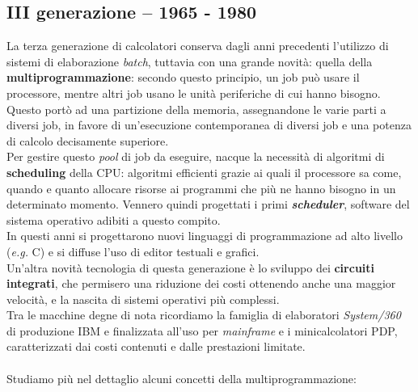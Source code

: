 \documentclass[12pt, letterpaper]{article}
\begin{document}
\subsection{III generazione -- 1965 - 1980}
La terza generazione di calcolatori conserva dagli anni precedenti l'utilizzo di sistemi di elaborazione \textit{batch}, tuttavia con una grande novità: quella della \textbf{multiprogrammazione}: secondo questo principio, un job può usare il processore, mentre altri job usano le unità periferiche di cui hanno bisogno. Questo portò ad una partizione della memoria, assegnandone le varie parti a diversi job, in favore di un'esecuzione contemporanea di diversi job e una potenza di calcolo decisamente superiore. \\
Per gestire questo \textit{pool} di job da eseguire, nacque la necessità di algoritmi di \textbf{scheduling} della CPU: algoritmi efficienti grazie ai quali il processore sa come, quando e quanto allocare risorse ai programmi che più ne hanno bisogno in un determinato momento. Vennero quindi progettati i primi \textit{\textbf{scheduler}}, software del sistema operativo adibiti a questo compito.\\
In questi anni si progettarono nuovi linguaggi di programmazione ad alto livello (\textit{e.g.} C) e si diffuse l'uso di editor testuali e grafici. \\
Un'altra novità tecnologia di questa generazione è lo sviluppo dei \textbf{circuiti integrati}, che permisero una riduzione dei costi ottenendo anche una maggior velocità, e la nascita di sistemi operativi più complessi. \\
Tra le macchine degne di nota ricordiamo la famiglia di elaboratori \textit{System/360} di produzione IBM e finalizzata all'uso per \textit{mainframe} e i minicalcolatori PDP, caratterizzati dai costi contenuti e dalle prestazioni limitate. \\ \\
Studiamo più nel dettaglio alcuni concetti della multiprogrammazione:\\
\end{document}
